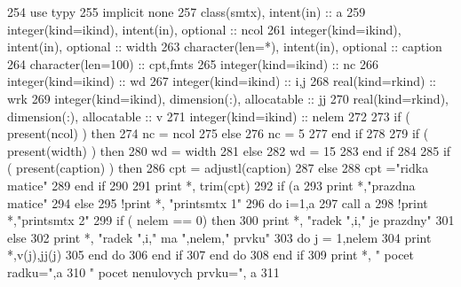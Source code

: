 \begin{DoxyCode}
254         \textcolor{keywordtype}{use }typy
255         \textcolor{keywordtype}{implicit none}
257         \textcolor{keywordtype}{class}(smtx), \textcolor{keywordtype}{intent(in)} :: a
259         \textcolor{keywordtype}{integer(kind=ikind)}, \textcolor{keywordtype}{intent(in)}, \textcolor{keywordtype}{optional} :: ncol
261         \textcolor{keywordtype}{integer(kind=ikind)}, \textcolor{keywordtype}{intent(in)}, \textcolor{keywordtype}{optional} :: width
263         \textcolor{keywordtype}{character(len=*)}, \textcolor{keywordtype}{intent(in)},    \textcolor{keywordtype}{optional} :: caption
264         \textcolor{keywordtype}{character(len=100)} :: cpt,fmts
265         \textcolor{keywordtype}{integer(kind=ikind)} :: nc
266         \textcolor{keywordtype}{integer(kind=ikind)} :: wd
267         \textcolor{keywordtype}{integer(kind=ikind)} :: i,j
268         \textcolor{keywordtype}{real(kind=rkind)} :: wrk
269         \textcolor{keywordtype}{integer(kind=ikind)}, \textcolor{keywordtype}{dimension(:)}, \textcolor{keywordtype}{allocatable} :: jj
270         \textcolor{keywordtype}{real(kind=rkind)}, \textcolor{keywordtype}{dimension(:)}, \textcolor{keywordtype}{allocatable} :: v
271         \textcolor{keywordtype}{integer(kind=ikind)} :: nelem
272 
273         \textcolor{keywordflow}{if} ( \textcolor{keyword}{present}(ncol) ) then
274             nc = ncol
275         else
276             nc = 5
277 \textcolor{keyword}{        end }if
278 
279         \textcolor{keywordflow}{if} ( \textcolor{keyword}{present}(width) ) then
280             wd = width
281         else
282             wd = 15
283 \textcolor{keyword}{        end }if
284 
285         \textcolor{keywordflow}{if} ( \textcolor{keyword}{present}(caption) ) then
286             cpt = adjustl(caption)
287         else
288             cpt =\textcolor{stringliteral}{"ridka matice"}
289 \textcolor{keyword}{        end }if
290 
291         print *, trim(cpt)
292         \textcolor{keywordflow}{if} (a%
293             print *,\textcolor{stringliteral}{"prazdna matice"}
294         else
295             \textcolor{comment}{!print *, "printsmtx 1"
}
296             \textcolor{keywordflow}{do} i=1,a%
297                 \textcolor{keyword}{call }a%
298                 \textcolor{comment}{!print *,"printsmtx 2"
}
299                 \textcolor{keywordflow}{if} ( nelem == 0) then
300                     print *, \textcolor{stringliteral}{"radek "},i,\textcolor{stringliteral}{" je prazdny"}
301                 else
302                     print *, \textcolor{stringliteral}{"radek "},i,\textcolor{stringliteral}{" ma "},nelem,\textcolor{stringliteral}{" prvku"}
303                     \textcolor{keywordflow}{do} j = 1,nelem
304                         print *,v(j),jj(j)
305 \textcolor{keyword}{                    end }do
306 \textcolor{keyword}{                end }if
307 \textcolor{keyword}{            end }do
308 \textcolor{keyword}{        end }if
309         print *, \textcolor{stringliteral}{" pocet radku="},a%
310             \textcolor{stringliteral}{" pocet nenulovych prvku="}, a%
311 
\end{DoxyCode}
